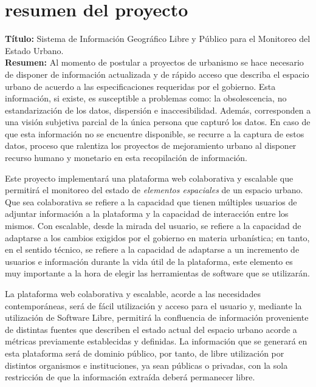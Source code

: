 \documentclass[12pt]{article}
\begin{document}
\newpage
\section{resumen del proyecto}
\noindent \textbf{Título:}
Sistema de Información Geográfico Libre y Público para el Monitoreo del Estado
Urbano.\\


\noindent \textbf{Resumen:} 
	Al momento de postular a proyectos de urbanismo se hace necesario de
	disponer de información actualizada y de rápido acceso que describa el
	espacio urbano de acuerdo a las especificaciones requeridas por el
	gobierno. Esta información, si existe, es susceptible a problemas como:
	la obsolescencia, no estandarización de los datos, dispersión e
	inaccesibilidad. Además, corresponden a una visión subjetiva parcial de
	la única persona que capturó los datos. En caso de que esta información
	no se encuentre disponible, se recurre a la captura de estos datos,
	proceso que ralentiza los proyectos de mejoramiento urbano al disponer
	recurso humano y monetario en esta recopilación de información.

	Este proyecto implementará una plataforma web colaborativa y escalable
	que permitirá el monitoreo del estado de \emph{elementos espaciales} de
	un espacio urbano. Que sea colaborativa se refiere a la capacidad que
	tienen múltiples usuarios de adjuntar información a la plataforma y la
	capacidad de interacción entre los mismos. Con escalable, desde la
	mirada del usuario,  se refiere a la capacidad de adaptarse a los
	cambios exigidos por el gobierno en materia urbanística; en tanto, en el
	sentido técnico, se refiere a la capacidad de adaptarse a un incremento de
	usuarios e información durante la vida útil de la plataforma, este
	elemento es muy importante a la hora de elegir las herramientas de
	software que se utilizarán.

	La plataforma web colaborativa y escalable, acorde a las necesidades
	contemporáneas, será de fácil utilización y acceso para el usuario y,
	mediante la utilización de Software Libre, permitirá la confluencia de
	información proveniente de distintas fuentes que describen el estado
	actual del espacio urbano acorde a métricas previamente establecidas y
	definidas. La información que se generará en esta plataforma será de
	dominio público, por tanto, de libre utilización por distintos
	organismos e instituciones, ya sean públicas o privadas, con la sola
	restricción de que la información extraída deberá permanecer libre.
\end{document}
